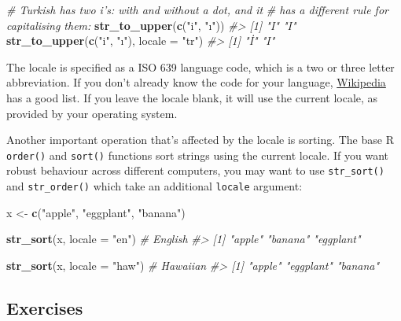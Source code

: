\documentclass[]{book}
\newenvironment{Shaded}{\begin{snugshade}}{\end{snugshade}}
\newcommand{\KeywordTok}[1]{\textcolor[rgb]{0.13,0.29,0.53}{\textbf{{#1}}}}
\newcommand{\DataTypeTok}[1]{\textcolor[rgb]{0.13,0.29,0.53}{{#1}}}
\newcommand{\StringTok}[1]{\textcolor[rgb]{0.31,0.60,0.02}{{#1}}}
\newcommand{\CommentTok}[1]{\textcolor[rgb]{0.56,0.35,0.01}{\textit{{#1}}}}
\newcommand{\NormalTok}[1]{{#1}}
\begin{document}
\begin{Shaded}
\begin{Highlighting}[]
\CommentTok{# Turkish has two i's: with and without a dot, and it}
\CommentTok{# has a different rule for capitalising them:}
\KeywordTok{str_to_upper}\NormalTok{(}\KeywordTok{c}\NormalTok{(}\StringTok{"i"}\NormalTok{, }\StringTok{"ı"}\NormalTok{))}
\CommentTok{#> [1] "I" "I"}
\KeywordTok{str_to_upper}\NormalTok{(}\KeywordTok{c}\NormalTok{(}\StringTok{"i"}\NormalTok{, }\StringTok{"ı"}\NormalTok{), }\DataTypeTok{locale =} \StringTok{"tr"}\NormalTok{)}
\CommentTok{#> [1] "İ" "I"}
\end{Highlighting}
\end{Shaded}

The locale is specified as a ISO 639 language code, which is a two or
three letter abbreviation. If you don't already know the code for your
language,
\href{https://en.wikipedia.org/wiki/List_of_ISO_639-1_codes}{Wikipedia}
has a good list. If you leave the locale blank, it will use the current
locale, as provided by your operating system.

Another important operation that's affected by the locale is sorting.
The base R \texttt{order()} and \texttt{sort()} functions sort strings
using the current locale. If you want robust behaviour across different
computers, you may want to use \texttt{str\_sort()} and
\texttt{str\_order()} which take an additional \texttt{locale} argument:

\begin{Shaded}
\begin{Highlighting}[]
\NormalTok{x <-}\StringTok{ }\KeywordTok{c}\NormalTok{(}\StringTok{"apple"}\NormalTok{, }\StringTok{"eggplant"}\NormalTok{, }\StringTok{"banana"}\NormalTok{)}

\KeywordTok{str_sort}\NormalTok{(x, }\DataTypeTok{locale =} \StringTok{"en"}\NormalTok{)  }\CommentTok{# English}
\CommentTok{#> [1] "apple"    "banana"   "eggplant"}

\KeywordTok{str_sort}\NormalTok{(x, }\DataTypeTok{locale =} \StringTok{"haw"}\NormalTok{) }\CommentTok{# Hawaiian}
\CommentTok{#> [1] "apple"    "eggplant" "banana"}
\end{Highlighting}
\end{Shaded}

\subsection{Exercises}\label{exercises-30}
\end{document}
